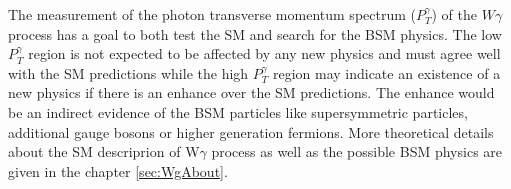 The measurement of the photon transverse momentum spectrum ($P_T^{\gamma}$) of the $W\gamma$ process has a goal to both test the SM and search for the BSM physics. The low $P_T^{\gamma}$ region is not expected to be affected by any new physics and must agree well with the SM predictions while the high $P_T^{\gamma}$ region may indicate an existence of a new physics if there is an enhance over the SM predictions. The enhance would be an indirect evidence of the BSM particles like supersymmetric particles, additional gauge bosons or higher generation fermions. More theoretical details about the SM descriprion of W$\gamma$ process as well as the possible BSM physics are given in the chapter \ref{sec:WgAbout}. \\   


